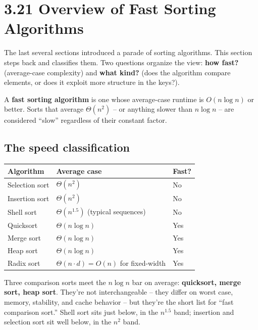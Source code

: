 \documentclass[11pt]{article}
\begin{document}
\section{3.21 Overview of Fast Sorting Algorithms}

The last several sections introduced a parade of sorting algorithms.
This section steps back and classifies them. Two questions organize
the view: \textbf{how fast?} (average-case complexity) and
\textbf{what kind?} (does the algorithm compare elements, or does it
exploit more structure in the keys?).

\begin{defnbox}
A \textbf{fast sorting algorithm} is one whose average-case runtime
is $O(n \log n)$ or better. Sorts that average $\Theta(n^2)$ -- or
anything slower than $n \log n$ -- are considered ``slow''
regardless of their constant factor.
\end{defnbox}

\subsection{The speed classification}

\begin{center}
\footnotesize
\renewcommand{\arraystretch}{1.3}
\begin{tabular}{@{}lll@{}}
\hline
\textbf{Algorithm} & \textbf{Average case} & \textbf{Fast?} \\
\hline
Selection sort   & $\Theta(n^2)$          & No \\
Insertion sort   & $\Theta(n^2)$          & No \\
Shell sort       & $\Theta(n^{1.5})$ (typical sequences) & No \\
Quicksort        & $\Theta(n \log n)$     & Yes \\
Merge sort       & $\Theta(n \log n)$     & Yes \\
Heap sort        & $\Theta(n \log n)$     & Yes \\
Radix sort       & $\Theta(n \cdot d) = O(n)$ for fixed-width & Yes \\
\hline
\end{tabular}
\end{center}

\begin{ideabox}
Three comparison sorts meet the $n \log n$ bar on average:
\textbf{quicksort, merge sort, heap sort}. They're not
interchangeable -- they differ on worst case, memory, stability, and
cache behavior -- but they're the short list for ``fast comparison
sort.'' Shell sort sits just below, in the $n^{1.5}$ band;
insertion and selection sort sit well below, in the $n^2$ band.
\end{ideabox}
\end{document}

